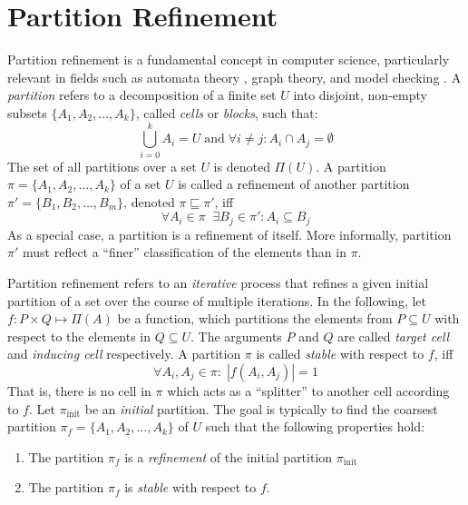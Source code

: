 	\section{Partition Refinement}
	\label{chap:prelims:partitionref}
		Partition refinement is a fundamental concept in computer science, particularly relevant in fields such as automata theory \cite{hopcroftLogALGORITHMMINIMIZING1971a}, graph theory, and model checking \cite{baierPrinciplesModelChecking2008}.
		A \textit{partition} refers to a decomposition of a finite set $U$ into disjoint, non-empty subsets $\{ A_1, A_2, \ldots, A_k \}$, called \textit{cells} or \textit{blocks}, such that:
		\begin{equation*}
			\bigcup^k_{i=0} A_i = U \; \mathrm{and} \; \forall i \neq j: A_i \cap A_j = \emptyset
		\end{equation*}
		The set of all partitions over a set $U$ is denoted $\Pi(U)$. A partition $\pi = \{ A_1, A_2, \ldots, A_k \}$ of a set $U$ is called a refinement of another partition $\pi' = \{ B_1, B_2, \ldots, B_m \}$, denoted $\pi \sqsubseteq \pi'$, iff
		\begin{equation*}
			\forall A_i \in \pi \;\; \exists B_j \in \pi' : A_i \subseteq B_j
		\end{equation*} 
		As a special case, a partition is a refinement of itself.
		More informally, partition $\pi'$ must reflect a \enquote{finer} classification of the elements than in $\pi$. 
		
		Partition refinement refers to an \textit{iterative} process that refines a given initial partition of a set over the course of multiple iterations.
		In the following, let $f: P \times Q \mapsto \Pi(A)$ be a function, which partitions the elements from $P \subseteq U$ with respect to the elements in $Q \subseteq U$. The arguments $P$ and $Q$ are called \textit{target cell} and \textit{inducing cell} respectively.
		A partition $\pi$ is called \textit{stable} with respect to $f$, iff
		\begin{equation*}
			\forall A_i, A_j \in \pi: \; |f(A_i, A_j)| = 1
		\end{equation*}
		That is, there is no cell in $\pi$ which acts as a \enquote{splitter} to another cell according to $f$.
		Let $\pi_{\mathrm{init}}$ be an \textit{initial} partition. The goal is typically to find the coarsest partition $\pi_f = \{ A_1, A_2, \ldots, A_k \}$ of $U$ such that the following properties hold:
		
		\begin{enumerate}
			\item The partition $\pi_f$ is a \textit{refinement} of the initial partition $\pi_{\mathrm{init}}$
			\item The partition $\pi_f$ is \textit{stable} with respect to $f$.
		\end{enumerate}
		
